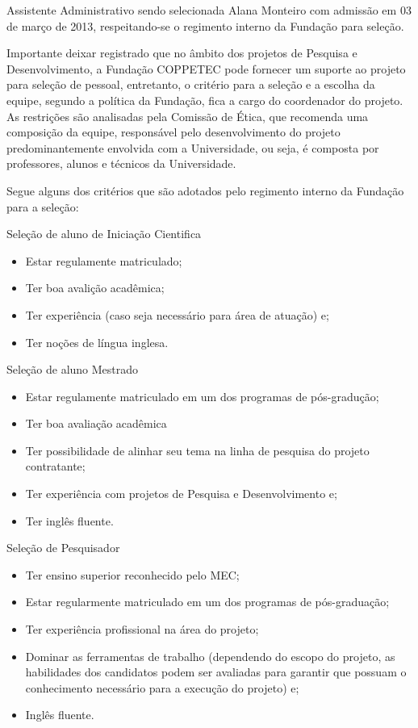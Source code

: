 Assistente Administrativo sendo selecionada Alana Monteiro com admissão em 03
de março de 2013, respeitando-se o regimento interno da Fundação para seleção.

Importante deixar registrado que no âmbito dos projetos de Pesquisa e
Desenvolvimento, a Fundação COPPETEC pode fornecer um suporte ao projeto
para seleção de pessoal, entretanto, o critério para a seleção e a escolha da
equipe, segundo a política da Fundação, fica a cargo do coordenador do projeto.
As restrições são analisadas pela Comissão de Ética, que recomenda uma
composição da equipe, responsável pelo desenvolvimento do projeto
predominantemente envolvida com a Universidade, ou seja, é composta por
professores, alunos e técnicos da Universidade.

Segue alguns dos critérios que são adotados pelo regimento interno da Fundação
para a seleção:

Seleção de aluno de Iniciação Cientifica
\begin{itemize}
  \item Estar regulamente matriculado;
  \item Ter boa avalição acadêmica;
  \item Ter experiência (caso seja necessário para área de atuação) e;
  \item Ter noções de língua inglesa.
 \end{itemize}
  
Seleção de aluno Mestrado
\begin{itemize}
  \item Estar regulamente matriculado em um dos programas de pós-gradução;
  \item Ter boa avaliação acadêmica
  \item Ter possibilidade de alinhar seu tema na linha de pesquisa do projeto
contratante;
  \item Ter experiência com projetos de Pesquisa e Desenvolvimento e;
  \item Ter inglês fluente.
\end{itemize}

Seleção de Pesquisador 
\begin{itemize}
  \item Ter ensino superior reconhecido pelo MEC;
  \item Estar regularmente matriculado em um dos programas de pós-graduação;
  \item Ter experiência profissional na área do projeto;
  \item Dominar as ferramentas de trabalho (dependendo do escopo do projeto, as
habilidades dos candidatos podem ser avaliadas para garantir que possuam o
conhecimento necessário para a execução do projeto) e;
  \item Inglês fluente. 
\end{itemize} 

